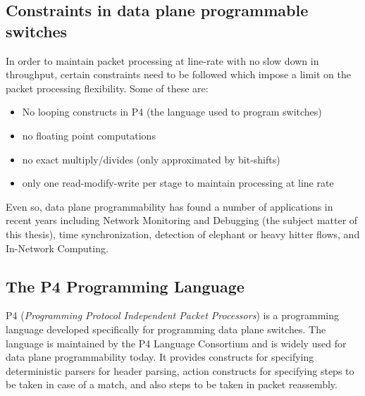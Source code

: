 \subsection{Constraints in data plane programmable switches}
In order to maintain packet processing at line-rate with no slow down in throughput, certain constraints need to be followed which impose a limit on the packet processing flexibility. Some of these are:
\begin{itemize}
  \item No looping constructs in P4 (the language used to program switches)
  \item no floating point computations
  \item no exact multiply/divides (only approximated by bit-shifts)
  \item only one read-modify-write per stage to maintain processing at line rate
\end{itemize}
Even so, data plane programmability has found a number of applications in recent years including Network Monitoring and Debugging (the subject matter of this thesis), time synchronization, detection 
of elephant or heavy hitter flows, and In-Network Computing.
\subsection{The P4 Programming Language}

P4 (\textit{Programming Protocol Independent Packet Processors}) is a programming language developed specifically for programming data plane switches. The language is maintained by the P4 Language Consortium and is widely used for data plane programmability today. It provides constructs for specifying deterministic parsers for header parsing, action constructs for specifying steps to be taken in case of a match, and also steps to be taken in packet reassembly.



